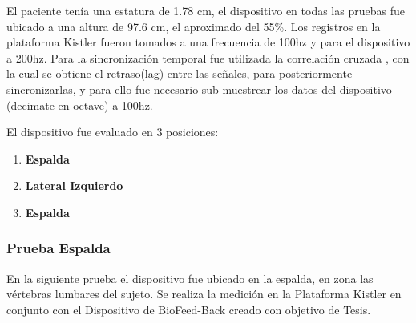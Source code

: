\documentclass[12pt,a4paper]{article}
\newcommand{\nombreDispositivo}{Dispositivo de BioFeed-Back }
\begin{document}
El paciente tenía una estatura de 1.78 cm, el dispositivo en todas las pruebas fue ubicado a una altura de 97.6 cm, el aproximado del 55\%.
Los registros en la plataforma Kistler fueron tomados a una frecuencia de 100hz y para el dispositivo a 200hz. 
Para la sincronización temporal fue utilizada la correlación cruzada \cite{correlacionCruzada}, con la cual se obtiene el retraso(lag) entre las señales, para posteriormente sincronizarlas, y para ello fue necesario sub-muestrear los datos del dispositivo (decimate en octave) a 100hz.

El dispositivo fue evaluado en 3 posiciones:
\begin{enumerate}
	\item \textbf{Espalda} 
	\item \textbf{Lateral Izquierdo}
	\item \textbf{Espalda}
\end{enumerate}

\newpage
\subsubsection{Prueba Espalda} En la siguiente prueba el dispositivo fue ubicado en la espalda, en zona las vértebras lumbares del sujeto. Se realiza la medición en la Plataforma Kistler en conjunto con el \nombreDispositivo creado con objetivo de Tesis.
		
\end{document}
